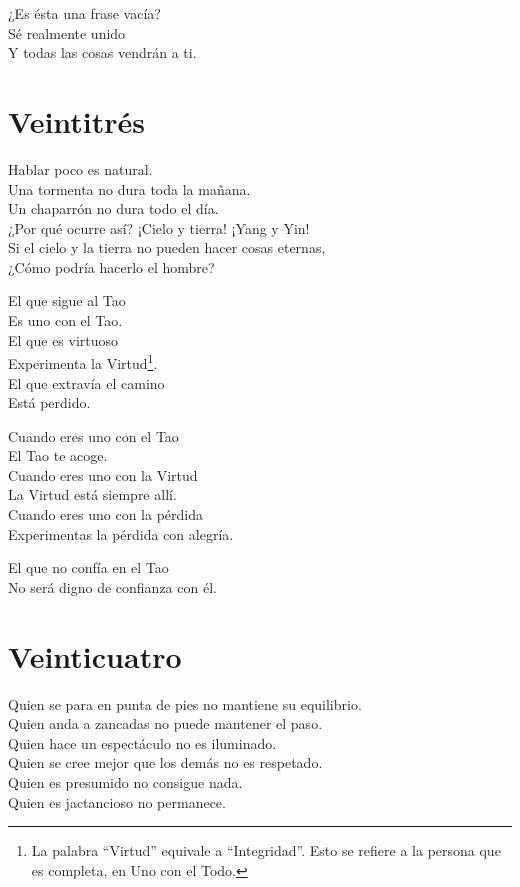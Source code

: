 \documentclass[hidelinks]{memoir}
\begin{document}
	¿Es ésta una frase vacía?\\
	Sé realmente unido\\
	Y todas las cosas vendrán a ti.
	
	\chapter*{Veintitrés}
	
	Hablar poco es natural.\\
	Una tormenta no dura toda la mañana.\\
	Un chaparrón no dura todo el día.\\
	¿Por qué ocurre así? ¡Cielo y tierra! ¡Yang y Yin!\\
	Si el cielo y la tierra no pueden hacer cosas eternas,\\
	¿Cómo podría hacerlo el hombre?
	
	El que sigue al Tao\\
	Es uno con el Tao.\\
	El que es virtuoso\\
	Experimenta la Virtud\footnote{La palabra ``Virtud'' equivale a ``Integridad''. Esto se refiere a la
		persona que es completa, en Uno con el Todo.}.\\
	El que extravía el camino\\
	Está perdido.
	
	Cuando eres uno con el Tao\\
	El Tao te acoge.\\
	Cuando eres uno con la Virtud\\
	La Virtud está siempre allí.\\
	Cuando eres uno con la pérdida\\
	Experimentas la pérdida con alegría.
	
	El que no confía en el Tao\\
	No será digno de confianza con él.
	
	\chapter*{Veinticuatro}
	
	Quien se para en punta de pies no mantiene su equilibrio.\\
	Quien anda a zancadas no puede mantener el paso.\\
	Quien hace un espectáculo no es iluminado.\\
	Quien se cree mejor que los demás no es respetado.\\
	Quien es presumido no consigue nada.\\
	Quien es jactancioso no permanece.
	
\end{document}
